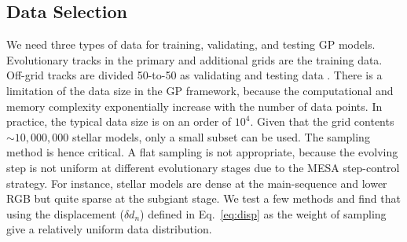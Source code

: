 \subsection{Data Selection}\label{sec:selection}

We need three types of data for training, validating, and testing GP models. 
%
Evolutionary tracks in the primary and additional grids are the training data. Off-grid tracks are divided 50-to-50 as validating and testing data . 
There is a limitation of the data size in the GP framework, because the computational and memory complexity exponentially increase with the number of data points. In practice, the typical data size is on an order of $10^{4}$. Given that the grid contents $\sim 10,000,000$ stellar models, only a small subset can be used. The sampling method is hence critical.
%
 A flat sampling is not appropriate, because the evolving step is not uniform at different evolutionary stages due to the \textsc{MESA} step-control strategy. For instance, stellar models are dense at the main-sequence and lower RGB but quite sparse at the subgiant stage. We test a few methods and find that using the displacement ($\delta d_{n}$) defined in Eq.~\ref{eq:disp} as the weight of sampling give a relatively uniform data distribution. 



